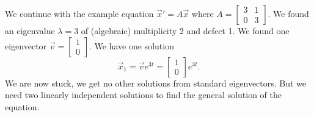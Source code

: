 \begin{example}
We continue with
the example equation ${\vec{x}}' = A\vec{x}$
where
$A = \left[ \begin{smallmatrix}
3 & 1 \\ 0 & 3
\end{smallmatrix} \right]$.
We found an eigenvalue $\lambda=3$ of (algebraic) multiplicity 2 and defect 1.
We found one eigenvector 
$\vec{v} = \left[ \begin{smallmatrix} 1 \\ 0 \end{smallmatrix} \right]$.
We have one solution
\begin{equation*}
\vec{x}_1 = \vec{v} e^{3t} = \begin{bmatrix} 1 \\ 0 \end{bmatrix} e^{3t} .
\end{equation*}
We are now stuck, we get no other solutions from standard eigenvectors.  But
we need two linearly independent solutions to find the general solution of
the equation.


\end{example}
